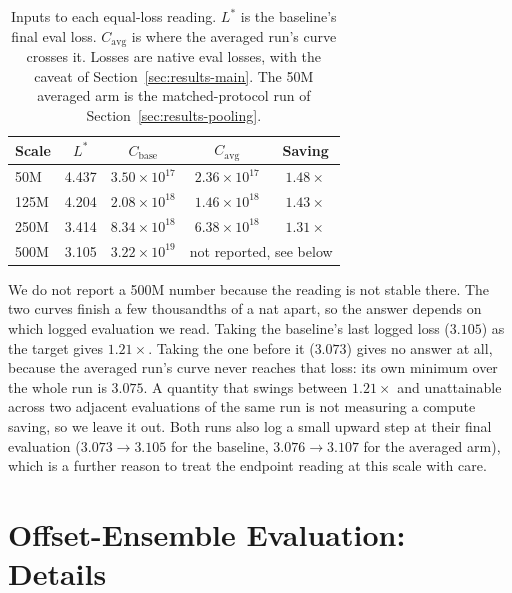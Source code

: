 \documentclass[11pt]{article}
\newcommand{\good}[1]{\textcolor{okgreen}{#1}}
\begin{document}
\begin{table}[h]
\centering
\caption{Inputs to each equal-loss reading. $L^\ast$ is the baseline's final
eval loss. $C_{\mathrm{avg}}$ is where the averaged run's curve crosses it.
Losses are native eval losses, with the caveat of
Section~\ref{sec:results-main}. The 50M averaged arm is the matched-protocol
run of Section~\ref{sec:results-pooling}.}
\label{tab:equalloss}
\vspace{0.4em}
\begin{tabular}{lcccc}
\toprule
Scale & $L^\ast$ & $C_{\mathrm{base}}$ & $C_{\mathrm{avg}}$ & Saving \\
\midrule
50M  & 4.437 & $3.50\times10^{17}$ & $2.36\times10^{17}$ & \good{$1.48\times$} \\
125M & 4.204 & $2.08\times10^{18}$ & $1.46\times10^{18}$ & \good{$1.43\times$} \\
250M & 3.414 & $8.34\times10^{18}$ & $6.38\times10^{18}$ & \good{$1.31\times$} \\
500M & 3.105 & $3.22\times10^{19}$ & \multicolumn{2}{l}{not reported, see below} \\
\bottomrule
\end{tabular}
\end{table}

We do not report a 500M number because the reading is not stable there. The
two curves finish a few thousandths of a nat apart, so the answer depends on
which logged evaluation we read. Taking the baseline's last logged loss
($3.105$) as the target gives $1.21\times$. Taking the one before it
($3.073$) gives no answer at all, because the averaged run's curve never
reaches that loss: its own minimum over the whole run is $3.075$. A quantity
that swings between $1.21\times$ and unattainable across two adjacent
evaluations of the same run is not measuring a compute saving, so we leave it
out. Both runs also log a small upward step at their final evaluation
($3.073 \to 3.105$ for the baseline, $3.076 \to 3.107$ for the averaged arm),
which is a further reason to treat the endpoint reading at this scale with
care.

\section{Offset-Ensemble Evaluation: Details}
\label{app:offset}
\end{document}
